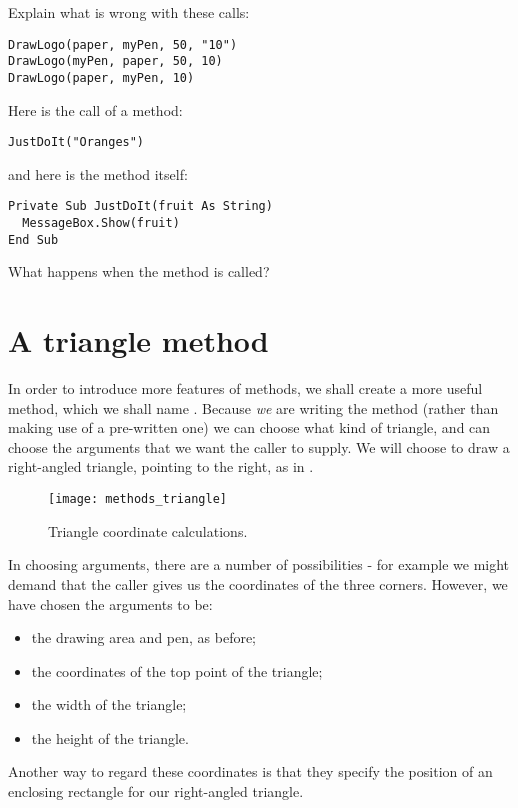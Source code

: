 		\begin{stqb}
			\begin{STQ}
				\item	Explain what is wrong with these calls:
					\begin{lstlisting}
DrawLogo(paper, myPen, 50, "10")
DrawLogo(myPen, paper, 50, 10)
DrawLogo(paper, myPen, 10)
					\end{lstlisting}
				\item	Here is the call of a method:
					\begin{lstlisting}
JustDoIt("Oranges")
					\end{lstlisting}
					and here is the method itself:
					\begin{lstlisting}
Private Sub JustDoIt(fruit As String) 
  MessageBox.Show(fruit)
End Sub
					\end{lstlisting}
					What happens when the method is called?
			\end{STQ}
		\end{stqb}

	\section{A triangle method}
	In order to introduce more features of methods, we shall create a more useful method, which we shall name . Because \emph{we} are writing the method (rather than making use of a pre-written one) we can choose what kind of triangle, and can choose the arguments that we want the caller to supply. We will choose to draw a right-angled triangle, pointing to the right, as in .

		\begin{figure}[ht]
			\centering
			\texttt{[image: methods\_triangle]}
			\caption{Triangle coordinate calculations.}
			\label{fig:methods_triangle}
		\end{figure}
		
		In choosing arguments, there are a number of possibilities - for example we might demand that the caller gives us the coordinates of the three corners. However, we have chosen the arguments to be:
		\begin{itemize}
			\item the drawing area and pen, as before;
			\item the coordinates of the top point of the triangle;
			\item the width of the triangle;
			\item the height of the triangle.
		\end{itemize}
		Another way to regard these coordinates is that they specify the position of an enclosing rectangle for our right-angled triangle.
		
